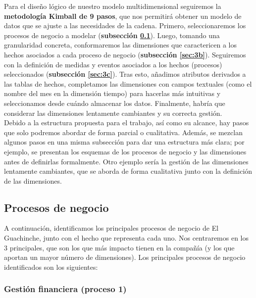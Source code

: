 \documentclass[12pt]{opticajnl}
\begin{document}
Para el diseño lógico de nuestro modelo multidimensional seguiremos la \textbf{metodología Kimball de 9 pasos}, que nos permitirá obtener un modelo de datos que se ajuste a las necesidades de la cadena. Primero, seleccionaremos los procesos de negocio a modelar (\textbf{subsección \ref{sec:3a}}). Luego, tomando una granularidad concreta, conformaremos las dimensiones que caractericen a los hechos asociados a cada proceso de negocio (\textbf{subsección \ref{sec:3b}}). Seguiremos con la definición de medidas y eventos asociados a los hechos (procesos) seleccionados (\textbf{subsección \ref{sec:3c}}). Tras esto, añadimos atributos derivados a las tablas de hechos, completamos las dimensiones con campos textuales (como el nombre del mes en la dimensión tiempo) para hacerlas más intuitivas y seleccionamos desde cuándo almacenar los datos. Finalmente, habría que considerar las dimensiones lentamente cambiantes y su correcta gestión. \\

Debido a la estructura propuesta para el trabajo, así como su alcance, hay pasos que solo podremos abordar de forma parcial o cualitativa. Además, se mezclan algunos pasos en una misma subsección para dar una estructura más clara; por ejemplo, se presentan los esquemas de los procesos de negocio y las dimensiones antes de definirlas formalmente. Otro ejemplo sería la gestión de las dimensiones lentamente cambiantes, que se aborda de forma cualitativa junto con la definición de las dimensiones. 

\subsection{Procesos de negocio} \label{sec:3a}

A continuación, identificamos los principales procesos de negocio de El Guachinche, junto con el hecho que representa cada uno. Nos centraremos en los 3 principales, que son los que más impacto tienen en la compañía (y los que aportan un mayor número de dimensiones). Los principales procesos de negocio identificados son los siguientes:


\subsubsection{Gestión financiera (proceso 1)}
\end{document}
